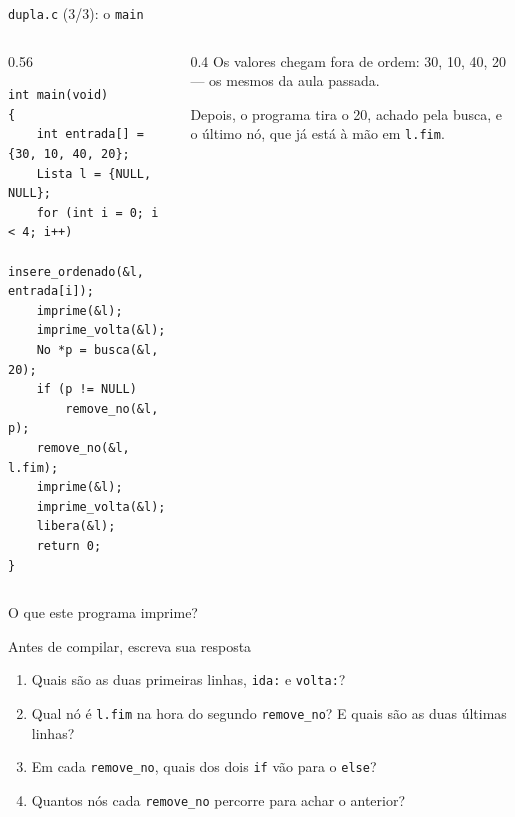 \documentclass[aspectratio=169]{beamer}
\begin{document}
\begin{frame}[fragile]{\texttt{dupla.c} (3/3): o \texttt{main}}
  \begin{columns}[c]
    \begin{column}{0.56\textwidth}
\begin{lstlisting}[style=codC]
int main(void)
{
    int entrada[] = {30, 10, 40, 20};
    Lista l = {NULL, NULL};
    for (int i = 0; i < 4; i++)
        insere_ordenado(&l, entrada[i]);
    imprime(&l);
    imprime_volta(&l);
    No *p = busca(&l, 20);
    if (p != NULL)
        remove_no(&l, p);
    remove_no(&l, l.fim);
    imprime(&l);
    imprime_volta(&l);
    libera(&l);
    return 0;
}
\end{lstlisting}
    \end{column}
    \begin{column}{0.4\textwidth}
      \small
      Os valores chegam fora de ordem: 30, 10, 40, 20 --- os mesmos da
      aula passada.

      \medskip
      Depois, o programa tira o 20, achado pela busca, e o último nó, que
      já está à mão em \texttt{l.fim}.
    \end{column}
  \end{columns}
\end{frame}

\begin{frame}{O que este programa imprime?}
  \begin{block}{Antes de compilar, escreva sua resposta}
    \begin{enumerate}
      \item Quais são as duas primeiras linhas, \texttt{ida:} e
        \texttt{volta:}?
      \item Qual nó é \texttt{l.fim} na hora do segundo
        \texttt{remove\_no}? E quais são as duas últimas linhas?
      \item Em cada \texttt{remove\_no}, quais dos dois \texttt{if} vão
        para o \texttt{else}?
      \item Quantos nós cada \texttt{remove\_no} percorre para achar o
        anterior?
    \end{enumerate}
  \end{block}
\end{frame}
\end{document}
